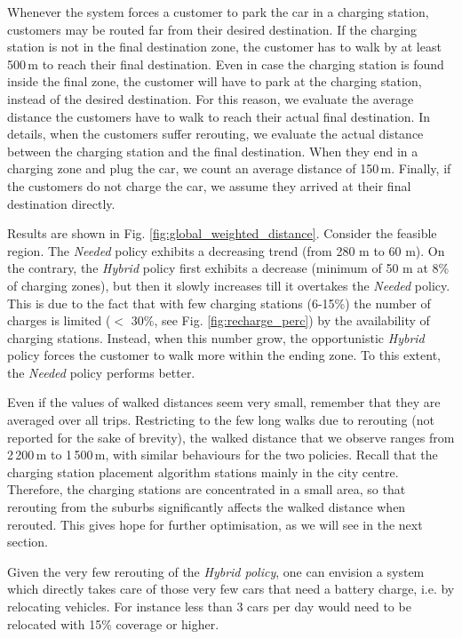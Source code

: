 \documentclass[review, letterpaper,3p, 11pt]{elsarticle}
\providecommand{\DIFaddtex}[1]{{\protect\color{blue}\uwave{#1}}} %
\providecommand{\DIFaddbegin}{} %
\providecommand{\DIFaddend}{} %
\providecommand{\DIFdelbegin}{} %
\providecommand{\DIFdelend}{} %
\providecommand{\DIFadd}[1]{\texorpdfstring{\DIFaddtex{#1}}{#1}} %
\providecommand{\DIFdel}[1]{} %
\begin{document}
Whenever the system forces a customer to park the car in a charging station, customers may be routed far from their desired destination. If the charging station is not in the final destination zone, the customer has to walk by at least 500\,m to reach their final destination. Even in case the charging station is found inside the final zone, the customer will have to park at the charging station, instead of the desired destination. 
For this reason, we evaluate the average distance the customers have to walk to reach their actual final destination. 
In details, when the customers suffer rerouting, we evaluate the actual distance between the charging station and the final destination. When they end in a charging zone and plug the car, we count an average distance of 150\,m. Finally, if the customers do not charge the car, we assume they arrived at their final destination directly.

Results are shown in Fig. \ref{fig:global_weighted_distance}.
Consider the feasible region. The \textit{Needed} policy exhibits a decreasing trend (from 280 m to 60 m). On the contrary, the \textit{Hybrid} policy first exhibits a decrease (minimum of 50 m at 8\% of charging zones), but then it slowly increases till it overtakes the \textit{Needed} policy. 
This is due to the fact that with few charging stations (6-15\%) the number of charges is limited ($<$ 30\%, see Fig. \ref{fig:recharge_perc}) by the availability of charging stations. Instead, when this number grow, the opportunistic \textit{Hybrid} policy 
forces the customer to walk more \DIFdelbegin \DIFdel{(}\DIFdelend \DIFaddbegin \DIFadd{times }\DIFaddend within the ending zone\DIFdelbegin \DIFdel{)}\DIFdelend .
To this extent, the \textit{Needed} policy performs better. 

Even if the values of walked distances seem very small, remember that they are averaged over all trips. Restricting to the few long walks due to rerouting (not reported for the sake of brevity), the walked distance that we observe ranges from 2\,200\,m to 1\,500\,m, with similar behaviours for the two policies. 
Recall that the charging station placement algorithm \DIFdelbegin \DIFdel{is likely placing }\DIFdelend \DIFaddbegin \DIFadd{likely places }\DIFaddend stations mainly in the city centre. Therefore, the charging stations are concentrated in a small area, so that rerouting from the suburbs significantly affects the walked distance when rerouted. This gives hope for further optimisation, as we will see in the next section.

Given the very few rerouting of the \textit{Hybrid policy}, one can envision a system which directly takes care of those very few cars that need a battery charge, i.e. by relocating vehicles. For instance less than 3 cars per day would need to be relocated with 15\% coverage or higher.
\end{document}
